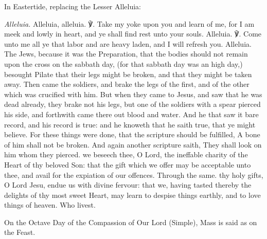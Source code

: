 \begin{rubric}
{In Eastertide, replacing the Lesser Alleluia:}
\end{rubric}\par\noindent
\textit{Alleluia.} Alleluia, alleluia. ℣. Take my yoke upon you and learn of me, for I am meek and lowly in heart, and ye shall find rest unto your souls. Alleluia. ℣. Come unto me all ye that labor and are heavy laden, and I will refresh you. Alleluia.
 The Jews, because it was the Preparation, that the bodies should not remain upon the cross on the sabbath day, (for that sabbath day was an high day,) besought Pilate that their legs might be broken, and that they might be taken away. Then came the soldiers, and brake the legs of the first, and of the other which was crucified with him. But when they came to Jesus, and saw that he was dead already, they brake not his legs, but one of the soldiers with a spear pierced his side, and forthwith came there out blood and water. And he that saw it bare record, and his record is true: and he knoweth that he saith true, that ye might believe. For these things were done, that the scripture should be fulfilled, A bone of him shall not be broken. And again another scripture saith, They shall look on him whom they pierced.
\secret
{} we beseech thee, O Lord, the ineffable charity of the Heart of thy beloved Son: that the gift which we offer may be acceptable unto thee, and avail for the expiation of our offences. Through the same.
\postcommunion
{} thy holy gifts, O Lord Jesu, endue us with divine fervour: that we, having tasted thereby the delights of thy most sweet Heart, may learn to despise things earthly, and to love things of heaven. Who livest.

\begin{rubric}
    On the Octave Day of the Compassion of Our Lord (Simple), Mass is said as on the Feast.
\end{rubric}

